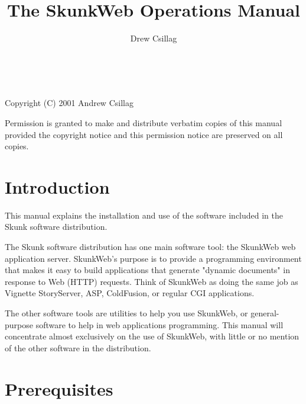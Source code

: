 \documentclass[titlepage]{manual}
\title{The SkunkWeb Operations Manual}
\author{Drew Csillag}
\begin{document}
\newcommand{\argdescitem}[1]{\hspace\labelsep
                                \normalfont\ttfamily #1\ }
\newenvironment{argdesc}{\begin{list}{}{
        \renewcommand{\makelabel}{\argdescitem}
}
}{\end{list}}

\newcommand{\doref}[1]{(see section \ref{#1}, page \pageref{#1})}


\maketitle
\ 
\vfill 

\noindent
Copyright (C) 2001 Andrew Csillag

\noindent
Permission is granted to make and distribute verbatim copies of
this manual provided the copyright notice and this permission notice
are preserved on all copies.


\tableofcontents


\chapter{Introduction}
   This manual explains the installation and use of the software included
   in the Skunk software distribution.
   
   The Skunk software distribution has one main software tool: the
   SkunkWeb web application server. SkunkWeb's purpose is to provide a
   programming environment that makes it easy to build applications
   that generate "dynamic documents" in response to Web (HTTP)
   requests. Think of SkunkWeb as doing the same job as Vignette
   StoryServer, ASP, ColdFusion, or regular CGI applications.
   
   The other software tools are utilities to help you use SkunkWeb, or
   general-purpose software to help in web applications programming. This
   manual will concentrate almost exclusively on the use of SkunkWeb, with
   little or no mention of the other software in the distribution.
     

\chapter{Prerequisites}
\end{document}
